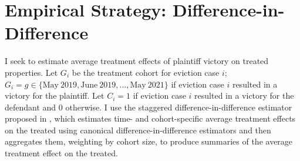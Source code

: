 \documentclass[12pt]{article}
\begin{document}
    


\section{Empirical Strategy: Difference-in-Difference}
    I seek to estimate average treatment effects of plaintiff victory on treated properties. Let $G_i$ be the treatment cohort for eviction case $i$; $G_i = g \in \{\text{May}\:2019, \text{June}\:2019, ..., \text{May}\:2021\}$ if eviction case $i$ resulted in a victory for the plaintiff. Let $C_i = 1$ if eviction case $i$ resulted in a victory for the defendant and $0$ otherwise. I use  the staggered difference-in-difference estimator proposed in \cite{callaway_sant'anna_2021}, which estimates time- and cohort-specific average treatment effects on the treated using canonical difference-in-difference estimators and then aggregates them, weighting by cohort size, to produce summaries of the average treatment effect on the treated.
\end{document}
